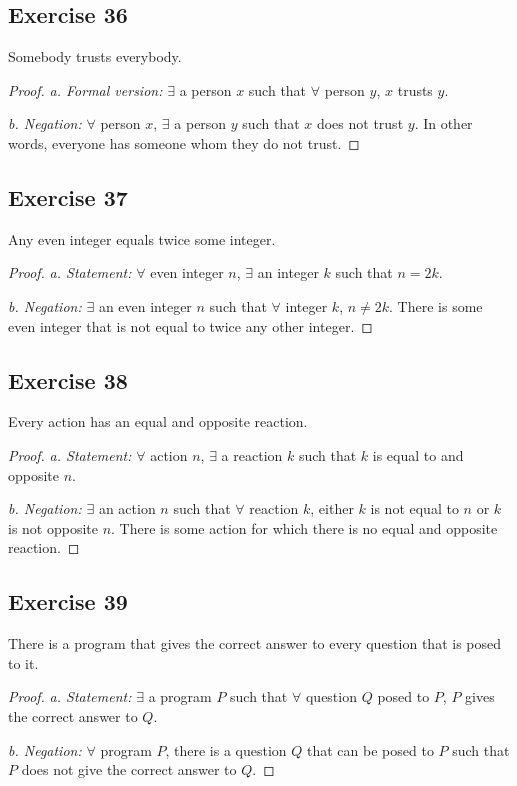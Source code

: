 \documentclass[14pt]{extarticle}
\newcommand{\fa}{\forall}
\newcommand{\te}{\exists}
\begin{document}
\subsection{Exercise 36}
Somebody trusts everybody.

\begin{proof}
    {\it a. Formal version:} $\te$ a person $x$ such that $\fa$ person $y$, $x$ trusts $y$.

        {\it b. Negation:} $\fa$ person $x$, $\te$ a person $y$ such that $x$ does not trust $y$. In other words, everyone has someone whom they do not trust.
\end{proof}

\subsection{Exercise 37}
Any even integer equals twice some integer.

\begin{proof}
    {\it a. Statement:} $\fa$ even integer $n$, $\te$ an integer $k$ such that $n = 2k$.

        {\it b. Negation:} $\te$ an even integer $n$ such that $\fa$ integer $k$, $n \neq 2k$. There is some even integer that is not equal to twice any other integer.
\end{proof}

\subsection{Exercise 38}
Every action has an equal and opposite reaction.

\begin{proof}
    {\it a. Statement:} $\fa$ action $n$, $\te$ a reaction $k$ such that $k$ is equal to and opposite $n$.

        {\it b. Negation:} $\te$ an action $n$ such that $\fa$ reaction $k$, either $k$ is not equal to $n$ or $k$ is not opposite $n$. There is some action for which there is no equal and opposite reaction.
\end{proof}

\subsection{Exercise 39}
There is a program that gives the correct answer to every question that is posed to it.

\begin{proof}
    {\it a. Statement:} $\te$ a program $P$ such that $\fa$ question $Q$ posed to $P$, $P$ gives the correct answer to $Q$.

        {\it b. Negation:} $\fa$ program $P$, there is a question $Q$ that can be posed to $P$ such that $P$ does not give the correct answer to $Q$.
\end{proof}
\end{document}
